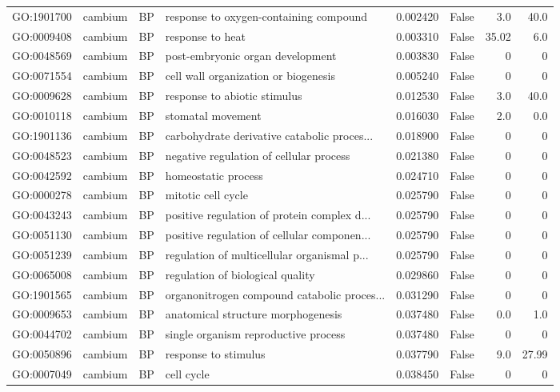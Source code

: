 \begin{longtable}{llllrlrr}
GO:1901700 & cambium & BP &   response to oxygen-containing compound  & 0.002420 &   False  & 3.0 & 40.0 \\ 
GO:0009408 & cambium & BP &   response to heat  & 0.003310 &   False  & 35.02 & 6.0 \\ 
GO:0048569 & cambium & BP &   post-embryonic organ development  & 0.003830 &   False  & 0 & 0 \\
GO:0071554 & cambium & BP &   cell wall organization or biogenesis  & 0.005240 &   False  & 0 & 0 \\
GO:0009628 & cambium & BP &   response to abiotic stimulus  & 0.012530 &   False  & 3.0 & 40.0 \\ 
GO:0010118 & cambium & BP &   stomatal movement  & 0.016030 &   False  & 2.0 & 0.0 \\ 
GO:1901136 & cambium & BP &   carbohydrate derivative catabolic proces...  & 0.018900 &   False  & 0 & 0 \\
GO:0048523 & cambium & BP &   negative regulation of cellular process  & 0.021380 &   False  & 0 & 0 \\
GO:0042592 & cambium & BP &   homeostatic process  & 0.024710 &   False  & 0 & 0 \\
GO:0000278 & cambium & BP &   mitotic cell cycle  & 0.025790 &   False  & 0 & 0 \\
GO:0043243 & cambium & BP &   positive regulation of protein complex d...  & 0.025790 &   False  & 0 & 0 \\
GO:0051130 & cambium & BP &   positive regulation of cellular componen...  & 0.025790 &   False  & 0 & 0 \\
GO:0051239 & cambium & BP &   regulation of multicellular organismal p...  & 0.025790 &   False  & 0 & 0 \\
GO:0065008 & cambium & BP &   regulation of biological quality  & 0.029860 &   False  & 0 & 0 \\
GO:1901565 & cambium & BP &   organonitrogen compound catabolic proces...  & 0.031290 &   False  & 0 & 0 \\
GO:0009653 & cambium & BP &   anatomical structure morphogenesis  & 0.037480 &   False  & 0.0 & 1.0 \\ 
GO:0044702 & cambium & BP &   single organism reproductive process  & 0.037480 &   False  & 0 & 0 \\
GO:0050896 & cambium & BP &   response to stimulus  & 0.037790 &   False  & 9.0 & 27.99 \\ 
GO:0007049 & cambium & BP &   cell cycle  & 0.038450 &   False  & 0 & 0 \\

\end{longtable}
